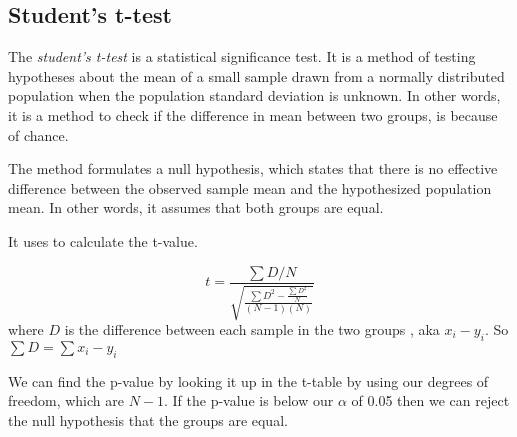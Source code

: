 \subsection{Student's t-test}
\label{BT:t-statistic-test}
The \textit{student's t-test} is a statistical significance test.
It is a method of testing hypotheses about the mean of a small sample drawn from
a normally distributed population when the population standard deviation is unknown.
In other words, it is a method to check if the difference in mean between two groups,
is because of chance.

The method formulates a null hypothesis, which states that there is no effective difference
between the observed sample mean and the hypothesized population mean. In other words, it assumes that
both groups are equal.

It uses  to calculate the t-value.


\begin{equation}
  \label{eq:t-formula-simplified}
  t = \frac{\sum{D} / N} {\sqrt{\frac{\sum{D^2} - \frac{\sum{D}^2}{N}}{(N-1)(N)} } }
\end{equation}
where $D$ is the difference between each sample in the two groups , aka $x_i - y_i$.
So $\sum{D} = \sum{x_i - y_i}$

We can find the p-value by looking it up in the t-table by using our degrees of freedom, which are $N-1$.
If the p-value is below our $\alpha$ of 0.05 then we can reject the null hypothesis that the groups are equal.


